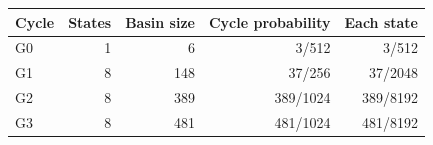 \begin{tabular}{lrrrr}
\toprule
Cycle & States & Basin size & Cycle probability & Each state \\
\midrule
G0 & 1 & 6 & 3/512 & 3/512 \\
G1 & 8 & 148 & 37/256 & 37/2048 \\
G2 & 8 & 389 & 389/1024 & 389/8192 \\
G3 & 8 & 481 & 481/1024 & 481/8192 \\
\bottomrule
\end{tabular}
